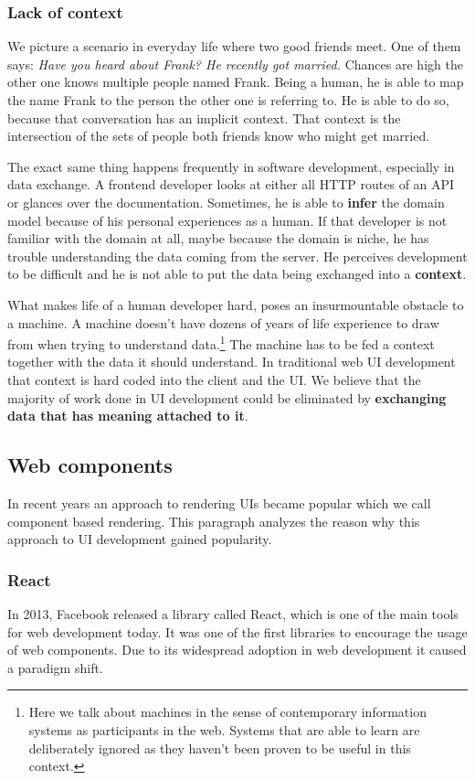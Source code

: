 \subsubsection{Lack of context}\label{datahumanmachine}
We picture a scenario in everyday life where two good friends meet. One of them says: \textit{Have you heard about Frank? He recently got married.} Chances are high the other one knows multiple people named Frank. Being a human, he is able to map the name Frank to the person the other one is referring to. He is able to do so, because that conversation has an implicit context. That context is the intersection of the sets of people both friends know who might get married.
\par The exact same thing happens frequently in software development, especially in data exchange. A frontend developer looks at either all HTTP routes of an API or glances over the documentation. Sometimes, he is able to \textbf{infer} the domain model because of his personal experiences as a human. If that developer is not familiar with the domain at all, maybe because the domain is niche, he has trouble understanding the data coming from the server. He perceives development to be difficult and he is not able to put the data being exchanged into a \textbf{context}.
\par What makes life of a human developer hard, poses an insurmountable obstacle to a machine. A machine doesn't have dozens of years of life experience to draw from when trying to understand data.\footnote{Here we talk about machines in the sense of contemporary information systems as participants in the web. Systems that are able to learn are deliberately ignored as they haven't been proven to be useful in this context.} The machine has to be fed a context together with the data it should understand. In traditional web UI development that context is hard coded into the client and the UI. We believe that the majority of work done in UI development could be eliminated by \textbf{exchanging data that has meaning attached to it}.

\subsection{Web components}\label{webcomponents}
In recent years an approach to rendering UIs became popular which we call component based rendering. This paragraph analyzes the reason why this approach to UI development gained popularity.

\subsubsection{React}\label{sec:react}
In 2013, Facebook released a library called React, which is one of the main tools for web development today. It was one of the first libraries to encourage the usage of web components. Due to its widespread adoption in web development it caused a paradigm shift.

